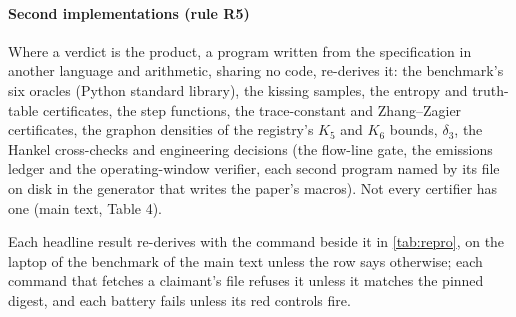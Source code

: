 \documentclass[preprint,11pt,a4paper]{elsarticle}
\theoremstyle{definition}
\begin{document}
\paragraph{Second implementations (rule R5)} Where a verdict is the product, a program written from the specification in another language and arithmetic, sharing no code, re-derives it: the benchmark's six oracles (Python standard library), the kissing samples, the entropy and truth-table certificates, the step functions, the trace-constant and Zhang--Zagier certificates, the graphon densities of the registry's $K_5$ and $K_6$ bounds, $\delta_3$, the Hankel cross-checks and \MtSecondImpls{} engineering decisions (the flow-line gate, the emissions ledger and the operating-window verifier, each second program named by its file on disk in the generator that writes the paper's macros). Not every certifier has one (main text, Table 4).

Each headline result re-derives with the command beside it in \cref{tab:repro}, on the laptop of the benchmark of the main text unless the row says otherwise; each command that fetches a claimant's file refuses it unless it matches the pinned digest, and each battery fails unless its red controls fire.
\end{document}

